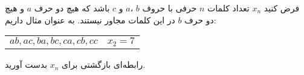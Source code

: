 \p
    فرض کنید $x_n$ تعداد کلمات $n$ حرفی با حروف $b$ ،$a$ و $c$ باشد که هیچ دو حرف $a$ و هیچ دو حرف $b$ در این کلمات مجاور نیستند. به عنوان مثال داریم:
    
    \begin{flushleft}
        \begin{tabular}{ c c }
            $ab, ac, ba, bc, ca, cb, cc$ & $x_2=7$
        \end{tabular}
    \end{flushleft}
    
    رابطه‌ای بازگشتی برای $x_n$ بدست آورید.
